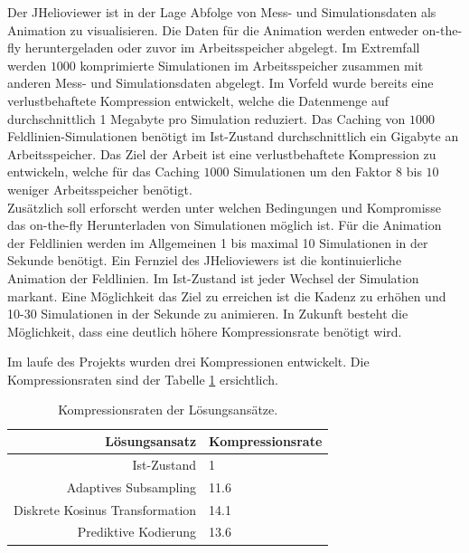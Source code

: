 Der JHelioviewer ist in der Lage Abfolge von Mess- und Simulationsdaten als Animation zu visualisieren. Die Daten für die Animation werden entweder on-the-fly heruntergeladen oder zuvor im Arbeitsspeicher abgelegt. Im Extremfall werden $1000$ komprimierte Simulationen im Arbeitsspeicher zusammen mit anderen Mess- und Simulationsdaten abgelegt. Im Vorfeld wurde bereits eine verlustbehaftete Kompression entwickelt, welche die Datenmenge auf durchschnittlich 1 Megabyte pro Simulation reduziert. Das Caching von $1000$ Feldlinien-Simulationen benötigt im Ist-Zustand durchschnittlich ein Gigabyte an Arbeitsspeicher. Das Ziel der Arbeit ist eine verlustbehaftete Kompression zu entwickeln, welche für das Caching $1000$ Simulationen um den Faktor $8$ bis $10$ weniger Arbeitsspeicher benötigt.\\
Zusätzlich soll erforscht werden unter welchen Bedingungen und Kompromisse das on-the-fly Herunterladen von Simulationen möglich ist. Für die Animation der Feldlinien werden im Allgemeinen 1 bis maximal 10 Simulationen in der Sekunde benötigt. Ein Fernziel des JHelioviewers ist die kontinuierliche Animation der Feldlinien. Im Ist-Zustand ist jeder Wechsel der Simulation markant. Eine Möglichkeit das Ziel zu erreichen ist die Kadenz zu erhöhen und 10-30 Simulationen in der Sekunde zu animieren. In Zukunft besteht die Möglichkeit, dass eine deutlich höhere Kompressionsrate benötigt wird.

Im laufe des Projekts wurden drei Kompressionen entwickelt. Die Kompressionsraten sind der Tabelle \ref{einleitung:tabelle} ersichtlich.
\begin{table}[!htbp]
	\center
	\begin{tabular}{r|l}
		Lösungsansatz & Kompressionsrate \\\hline
		Ist-Zustand & 1\\
		Adaptives Subsampling & 11.6 \\
		Diskrete Kosinus Transformation & 14.1 \\
		Prediktive Kodierung & 13.6\\
	\end{tabular}
	\caption{Kompressionsraten der Lösungsansätze.}
	\label{einleitung:tabelle}
\end{table}